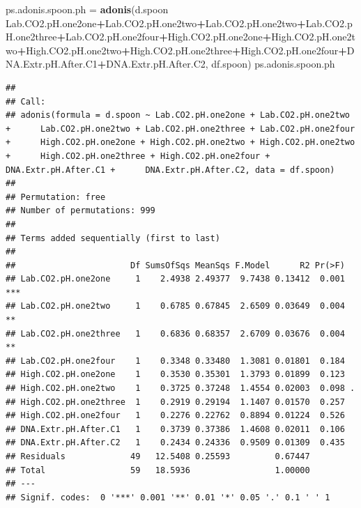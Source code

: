 \documentclass[]{article}
\newenvironment{Shaded}{\begin{snugshade}}{\end{snugshade}}
\newcommand{\KeywordTok}[1]{\textcolor[rgb]{0.13,0.29,0.53}{\textbf{#1}}}
\newcommand{\NormalTok}[1]{#1}
\newcommand{\OperatorTok}[1]{\textcolor[rgb]{0.81,0.36,0.00}{\textbf{#1}}}
\newcommand{\StringTok}[1]{\textcolor[rgb]{0.31,0.60,0.02}{#1}}
\begin{document}
\begin{Shaded}
\begin{Highlighting}[]
\NormalTok{ps.adonis.spoon.ph =}\StringTok{ }\KeywordTok{adonis}\NormalTok{(d.spoon }\OperatorTok{~}\StringTok{ }\NormalTok{Lab.CO2.pH.one2one}\OperatorTok{+}\NormalTok{Lab.CO2.pH.one2two}\OperatorTok{+}\NormalTok{Lab.CO2.pH.one2two}\OperatorTok{+}\NormalTok{Lab.CO2.pH.one2three}\OperatorTok{+}\NormalTok{Lab.CO2.pH.one2four}\OperatorTok{+}\NormalTok{High.CO2.pH.one2one}\OperatorTok{+}\NormalTok{High.CO2.pH.one2two}\OperatorTok{+}\NormalTok{High.CO2.pH.one2two}\OperatorTok{+}\NormalTok{High.CO2.pH.one2three}\OperatorTok{+}\NormalTok{High.CO2.pH.one2four}\OperatorTok{+}\NormalTok{DNA.Extr.pH.After.C1}\OperatorTok{+}\NormalTok{DNA.Extr.pH.After.C2, df.spoon)}
\NormalTok{ps.adonis.spoon.ph}
\end{Highlighting}
\end{Shaded}

\begin{verbatim}
## 
## Call:
## adonis(formula = d.spoon ~ Lab.CO2.pH.one2one + Lab.CO2.pH.one2two +      Lab.CO2.pH.one2two + Lab.CO2.pH.one2three + Lab.CO2.pH.one2four +      High.CO2.pH.one2one + High.CO2.pH.one2two + High.CO2.pH.one2two +      High.CO2.pH.one2three + High.CO2.pH.one2four + DNA.Extr.pH.After.C1 +      DNA.Extr.pH.After.C2, data = df.spoon) 
## 
## Permutation: free
## Number of permutations: 999
## 
## Terms added sequentially (first to last)
## 
##                       Df SumsOfSqs MeanSqs F.Model      R2 Pr(>F)    
## Lab.CO2.pH.one2one     1    2.4938 2.49377  9.7438 0.13412  0.001 ***
## Lab.CO2.pH.one2two     1    0.6785 0.67845  2.6509 0.03649  0.004 ** 
## Lab.CO2.pH.one2three   1    0.6836 0.68357  2.6709 0.03676  0.004 ** 
## Lab.CO2.pH.one2four    1    0.3348 0.33480  1.3081 0.01801  0.184    
## High.CO2.pH.one2one    1    0.3530 0.35301  1.3793 0.01899  0.123    
## High.CO2.pH.one2two    1    0.3725 0.37248  1.4554 0.02003  0.098 .  
## High.CO2.pH.one2three  1    0.2919 0.29194  1.1407 0.01570  0.257    
## High.CO2.pH.one2four   1    0.2276 0.22762  0.8894 0.01224  0.526    
## DNA.Extr.pH.After.C1   1    0.3739 0.37386  1.4608 0.02011  0.106    
## DNA.Extr.pH.After.C2   1    0.2434 0.24336  0.9509 0.01309  0.435    
## Residuals             49   12.5408 0.25593         0.67447           
## Total                 59   18.5936                 1.00000           
## ---
## Signif. codes:  0 '***' 0.001 '**' 0.01 '*' 0.05 '.' 0.1 ' ' 1
\end{verbatim}
\end{document}
